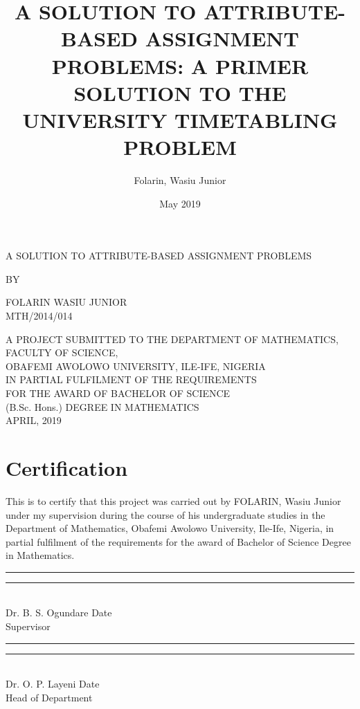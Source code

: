 \documentclass[a4paper,openany]{book}
\title{A SOLUTION TO ATTRIBUTE-BASED ASSIGNMENT PROBLEMS: A PRIMER SOLUTION TO THE UNIVERSITY TIMETABLING PROBLEM}
\date{May 2019}
\author{Folarin, Wasiu Junior}
\begin{document}
	\linespread{1.6}
	\large
	\setlength{\biblabelsep}{0.3em}
	\makeatletter
	\renewcommand{\@biblabel}[1]{\stepcounter{MyBibCount}\theMyBibCount. }
	\makeatother
	\frontmatter
	\begin{titlepage}
		\begin{center}
			A SOLUTION TO ATTRIBUTE-BASED ASSIGNMENT PROBLEMS%
		\end{center}
		\vfill
		\begin{center}
			BY
		\end{center}
		\vfill
		\begin{center}
			FOLARIN WASIU JUNIOR\\[0.25in]
			MTH/2014/014
		\end{center}
		\vfill
		\begin{center}
			A PROJECT SUBMITTED TO THE DEPARTMENT OF MATHEMATICS, FACULTY OF SCIENCE,\\
			OBAFEMI AWOLOWO UNIVERSITY, ILE-IFE, NIGERIA\\
			IN PARTIAL FULFILMENT OF THE REQUIREMENTS\\
			FOR THE AWARD OF BACHELOR OF SCIENCE\\
			(B.Sc. Hons.) DEGREE IN MATHEMATICS\\ \bigskip
			APRIL, 2019
		\end{center}
	\end{titlepage}
	\chapter[Certification]{\centering Certification}
	This is to certify that this project was carried out by FOLARIN, Wasiu Junior under my supervision during the course of his undergraduate studies in the Department of Mathematics, Obafemi Awolowo University, Ile-Ife, Nigeria, in partial fulfilment of the requirements for the award of Bachelor of Science Degree in Mathematics.
	\\[1in]
	\rule{1.5in}{0.1pt} \hfill \rule{1in}{0.4pt}
	\\[2ex]
	Dr. B. S. Ogundare \hfill Date \hspace{4ex}
	\\[1ex]
	Supervisor
	\\[1.5in]
	\rule{1.5in}{0.1pt} \hfill \rule{1in}{0.4pt}
	\\[2ex]
	Dr. O. P. Layeni \hfill Date \hspace{4ex}
	\\[1ex]
	Head of Department
	
\end{document}
